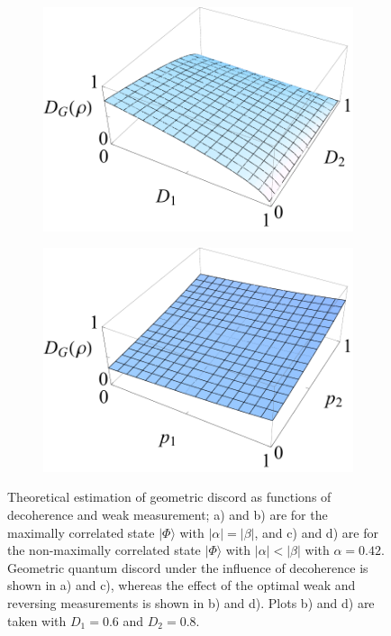 \documentclass[%
 reprint,
 amsmath,amssymb,
 aps,
]{revtex4-1}
\begin{document}
\begin{figure}
\begin{subfigure}[b]{0.23\textwidth}
                \includegraphics[width=\textwidth]{041DG}
                \caption{}
                \label{fig:A3G}
        \end{subfigure}
        \begin{subfigure}[b]{0.23\textwidth}
                \includegraphics[width=\textwidth]{041WG}
                \caption{}
                \label{fig:A4G}
        \end{subfigure}
        \caption{Theoretical estimation of geometric discord as functions of decoherence and weak measurement; a) and b) are for the maximally correlated state $|\Phi\rangle$ with $|\alpha|=|\beta|$, and c) and d) are for the non-maximally correlated state $|\Phi\rangle$ with $|\alpha| < |\beta|$ with $\alpha=0.42$. Geometric quantum discord under the influence of decoherence is shown in a) and c), whereas the effect of the optimal weak and reversing measurements is shown in b) and d). Plots b) and d) are taken with $D_1 = 0.6$ and $D_2 = 0.8$.}\label{fig:A5G}
\end{figure}
\end{document}
